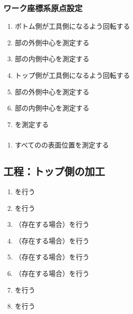 \subsubsection{ワーク座標系原点設定}
\begin{enumerate}[label*=\sarrow]
\item ボトム側が工具側になるよう回転する
\item \BottomEndFace 部の外側中心を測定する
\item \BottomEndFace 部の内側中心を測定する
\item トップ側が工具側になるよう回転する
\item \TopEndFace 部の外側中心を測定する
\item \TopEndFace 部の内側中心を測定する
\item \KeywayCenter を測定する
\end{enumerate}

\subsubsection{\DimpleMeasurement}
\begin{enumerate}[label*=\sarrow]
\item すべての\Dimple の表面位置を測定する
\end{enumerate}


\subsection{工程：トップ側の加工}
\begin{enumerate}[label*=\sarrow]
\item \DimpleMilling を行う
\item \TopEndFacecutMilling を行う
\item （存在する場合）\TopOutcutMilling を行う
\item （存在する場合）\TopCurvedOutcutMilling を行う
\item （存在する場合）\EndFaceBoringMilling を行う
\item （存在する場合）\IncutBoringMilling を行う
\item \TopEndFaceOutCChamferMilling を行う
\item \TopEndFaceInCChamferMilling を行う
\end{enumerate}


